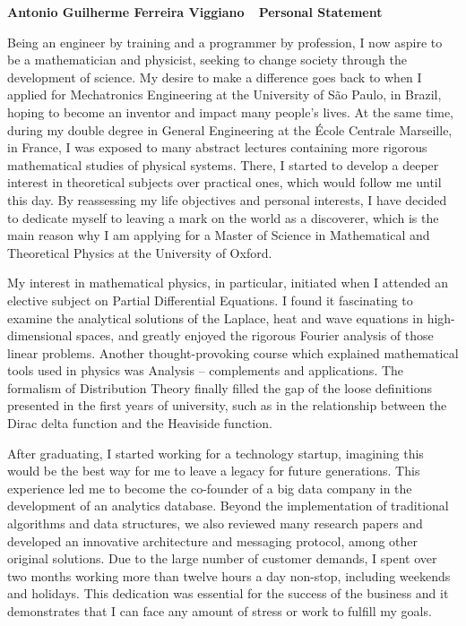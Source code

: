 \documentclass[10pt]{article}
\def\firstname{Antonio Guilherme }
\def\familyname{Ferreira Viggiano}
\def\subj{Personal Statement}
\def\FileTitle{\firstname\familyname~\textemdash~\subj}
\begin{document}
\sffamily %

{\bfseries \FileTitle}



Being an engineer by training and a programmer by profession, I now aspire to be a mathematician and physicist, seeking to change society through the development of science. My desire to make a difference goes back to when I applied for Mechatronics Engineering at the University of São Paulo, in Brazil, hoping to become an inventor and impact many people's lives. At the same time, during my double degree in General Engineering at the École Centrale Marseille, in France, I was exposed to many abstract lectures containing more rigorous mathematical studies of physical systems. There, I started to develop a deeper interest in theoretical subjects over practical ones, which would follow me until this day. By reassessing my life objectives and personal interests, I have decided to dedicate myself to leaving a mark on the world as a discoverer, which is the main reason why I am applying for a Master of Science in Mathematical and Theoretical Physics at the University of Oxford.

My interest in mathematical physics, in particular, initiated when I attended an elective subject on Partial Differential Equations. I found it fascinating to examine the analytical solutions of the Laplace, heat and wave equations in high-dimensional spaces, and greatly enjoyed the rigorous Fourier analysis of those linear problems. Another thought-provoking course which explained mathematical tools used in physics was Analysis -- complements and applications. The formalism of Distribution Theory finally filled the gap of the loose definitions presented in the first years of university, such as in the relationship between the Dirac delta function and the Heaviside function.

After graduating, I started working for a technology startup, imagining this would be the best way for me to leave a legacy for future generations. This experience led me to become the co-founder of a big data company in the development of an analytics database. Beyond the implementation of traditional algorithms and data structures, we also reviewed many research papers and developed an innovative architecture and messaging protocol, among other original solutions. Due to the large number of customer demands, I spent over two months working more than twelve hours a day non-stop, including weekends and holidays. This dedication was essential for the success of the business and it demonstrates that I can face any amount of stress or work to fulfill my goals.
\end{document}
